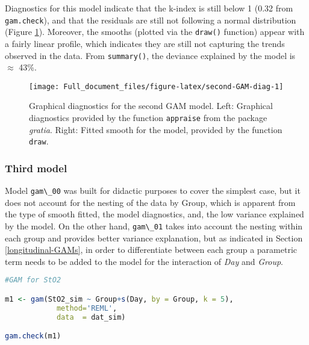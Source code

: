 \documentclass[
]{article}
\newcommand{\passthrough}[1]{#1}
\begin{document}
Diagnostics for this model indicate that the k-index is still below 1 (0.32 from \passthrough{\lstinline!gam.check!}), and that the residuals are still not following a normal distribution (Figure \ref{fig:second-GAM-diag}). Moreover, the smooths (plotted via the \passthrough{\lstinline!draw()!} function) appear with a fairly linear profile, which indicates they are still not capturing the trends observed in the data. From \passthrough{\lstinline!summary()!}, the deviance explained by the model is \(\approx\) 43\%.



\begin{figure}[H]

{\centering \texttt{[image: Full\_document\_files/figure-latex/second-GAM-diag-1]} 

}

\caption{Graphical diagnostics for the second GAM model. Left: Graphical diagnostics provided by the function \passthrough{\lstinline!appraise!} from the package \emph{gratia}. Right: Fitted smooth for the model, provided by the function \passthrough{\lstinline!draw!}.}\label{fig:second-GAM-diag}
\end{figure}

\hypertarget{third-model}{%
\subsubsection{Third model}\label{third-model}}

Model \passthrough{\lstinline!gam\_00!} was built for didactic purposes to cover the simplest case, but it does not account for the nesting of the data by Group, which is apparent from the type of smooth fitted, the model diagnostics, and, the low variance explained by the model. On the other hand, \passthrough{\lstinline!gam\_01!} takes into account the nesting within each group and provides better variance explanation, but as indicated in Section \ref{longitudinal-GAMs}, in order to differentiate between each group a parametric term needs to be added to the model for the interaction of \emph{Day} and \emph{Group}.

\begin{lstlisting}[language=R]
#GAM for StO2

m1 <- gam(StO2_sim ~ Group+s(Day, by = Group, k = 5),
            method='REML',
            data  = dat_sim)

gam.check(m1)
\end{lstlisting}
\end{document}
